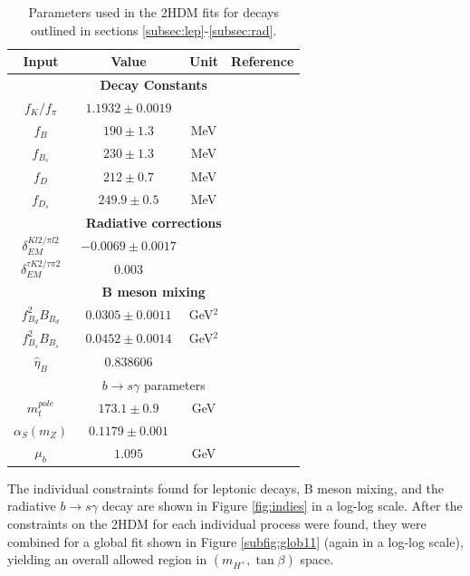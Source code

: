 \documentclass[a4paper,12pt]{article}
\begin{document}
\begin{table}[ht]
    \centering
    \begin{tabular}{c|ccc}
        \hline\hline
        Input & Value & Unit & Reference \\
        \hline\hline
        \multicolumn{4}{c}{\bfseries Decay Constants} \\
        \hline\hline
        $f_K/f_\pi$ & $1.1932\pm0.0019$ & & \cite{pdg}\\
        $f_B$ & $190\pm1.3$ & MeV & \cite{flag} \\
        $f_{B_s}$ & $230\pm1.3$ & MeV & \cite{flag} \\
        $f_D$ & $212\pm0.7$ & MeV & \cite{flag} \\
        $f_{D_s}$ & $249.9\pm0.5$ & MeV & \cite{flag} \\
        \hline\hline
        \multicolumn{4}{c}{\bfseries Radiative corrections} \\
        \hline\hline
        $\delta^{Kl2/\pi l2}_{EM}$ & $-0.0069\pm0.0017$ & & \cite{pdg} \\
        $\delta^{\tau K2/\tau\pi 2}_{EM}$ & $0.003$ & & \cite{desc} \\
        \hline\hline
        \multicolumn{4}{c}{\bfseries B meson mixing} \\
        \hline\hline
        $f^2_{B_d}B_{B_d}$ & $0.0305\pm0.0011$ & GeV$^2$ & \cite{bmix} \\
        $f^2_{B_s}B_{B_s}$ & $0.0452\pm0.0014$ & GeV$^2$ & \cite{bmix} \\
        $\hat{\eta}_B$ & $0.838606$ & & \cite{alex} \\
        \hline\hline
        \multicolumn{4}{c}{$b\to s\gamma$ parameters} \\
        \hline\hline
        $m_t^{pole}$ & $173.1\pm0.9$ & GeV & \cite{pdg} \\
        $\alpha_S(m_Z)$ & $0.1179\pm0.001$ & & \cite{pdg} \\
        $\mu_b$ & $1.095$ & GeV & \\
        \hline\hline
    \end{tabular}
    \caption{\label{tab:params} Parameters used in the 2HDM fits for decays outlined in sections \ref{subsec:lep}-\ref{subsec:rad}.}
\end{table}
The individual constraints found for leptonic decays, B meson mixing, and the radiative $b\to s\gamma$ decay are shown in Figure \ref{fig:indies} in a log-log scale.
After the constraints on the 2HDM for each individual process were found, they were combined for a global fit shown in Figure \ref{subfig:glob11} (again in a log-log scale), yielding an overall allowed region in $(m_{H^+},\tan\beta)$ space. 
\end{document}
